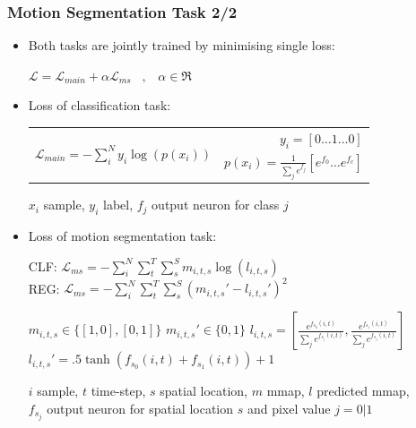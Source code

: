 \documentclass{beamer}
\begin{document}
\begin{frame}
\frametitle{Motion Segmentation Task 2/2}
\begin{adjustwidth}{-1.75em}{-1.75em}


\begin{itemize}
	\item Both tasks are jointly trained by minimising single loss:
	\begin{center}
	${\displaystyle {\mathcal{L} = \mathcal{L}_{main} + \alpha \mathcal{L}_{ms} \hspace{10pt} , \hspace{10pt} \alpha \in \Re} }$
	\end{center}
	
	\item Loss of classification task:
	
	\begin{center}
	\begin{tabular}{cr}
		\multirow{2}{*}{$ {\displaystyle \mathcal{L}_{main} = -\sum_i^N{y_i \log (p(x_i))} }$} 
		& $y_i = [0 \dots 1 \dots 0]$ \\
		& $ p(x_i) = \frac{1}{\sum_j e^{f_j}} [ e^{f_0} \dots e^{f_c} ]$
	\end{tabular}
	\end{center}

	{\scriptsize $x_i$ sample, $y_i$ label, $f_j$ output neuron for class $j$ }

	\item Loss of motion segmentation task:
	
	\begin{minipage}{.6\textwidth}
		CLF: $ {\displaystyle \mathcal{L}_{ms} = -\sum_i^N\sum_t^T\sum_s^S{m_{i,t,s} \log (l_{i,t,s}) } }$ \\
		REG: $ {\displaystyle \mathcal{L}_{ms} = -\sum_i^N\sum_t^T\sum_s^S{(m_{i,t,s}' - l_{i,t,s}')^2 } }$
	\end{minipage}%
	\begin{minipage}{.4\textwidth}
		\begin{flushright}
		${ \scriptstyle m_{i,t,s} \in \{ [1, 0], [0, 1] \} }$ 
		${ \scriptstyle m_{i,t,s}' \in \{ 0, 1 \} }$
		${ \scriptstyle l_{i,t,s} = \left [ \frac{e^{f_{s_0}(i, t)}}{\sum_j e^{f_{s_j}(i, t)}}, \frac{e^{f_{s_1}(i, t)}}{\sum_j e^{f_{s_j}(i, t)}} \right ] }$ \\
		${ \scriptstyle l_{i,t,s}' =  .5 \tanh (f_{s_0}(i, t) + f_{s_1}(i, t)) + 1 }$
		\end{flushright}
	\end{minipage}

	{\scriptsize $i$ sample, $t$ time-step, $s$ spatial location, $m$ mmap, $l$ predicted mmap, \\ \vspace*{-5pt} $f_{s_j}$ output neuron for spatial location $s$ and pixel value $j = 0|1$}

	
\end{itemize}

\end{adjustwidth}
\end{frame}
\end{document}
